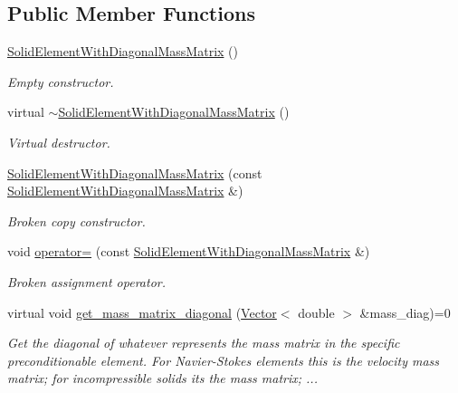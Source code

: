 \subsection*{Public Member Functions}
\begin{DoxyCompactItemize}
\item 
\hyperlink{classoomph_1_1SolidElementWithDiagonalMassMatrix_a2ae82e9b929bb41842955ab13f255104}{Solid\+Element\+With\+Diagonal\+Mass\+Matrix} ()
\begin{DoxyCompactList}\small\item\em Empty constructor. \end{DoxyCompactList}\item 
virtual \hyperlink{classoomph_1_1SolidElementWithDiagonalMassMatrix_aea964b70c55588fabf8cbc7fffe9be4a}{$\sim$\+Solid\+Element\+With\+Diagonal\+Mass\+Matrix} ()
\begin{DoxyCompactList}\small\item\em Virtual destructor. \end{DoxyCompactList}\item 
\hyperlink{classoomph_1_1SolidElementWithDiagonalMassMatrix_af26b74b9e29bc074bf2845556ff1bbae}{Solid\+Element\+With\+Diagonal\+Mass\+Matrix} (const \hyperlink{classoomph_1_1SolidElementWithDiagonalMassMatrix}{Solid\+Element\+With\+Diagonal\+Mass\+Matrix} \&)
\begin{DoxyCompactList}\small\item\em Broken copy constructor. \end{DoxyCompactList}\item 
void \hyperlink{classoomph_1_1SolidElementWithDiagonalMassMatrix_af7f7f5c4068cbfa7237be672d5b0fa58}{operator=} (const \hyperlink{classoomph_1_1SolidElementWithDiagonalMassMatrix}{Solid\+Element\+With\+Diagonal\+Mass\+Matrix} \&)
\begin{DoxyCompactList}\small\item\em Broken assignment operator. \end{DoxyCompactList}\item 
virtual void \hyperlink{classoomph_1_1SolidElementWithDiagonalMassMatrix_ad2335852a20987f6a6c8e0d6ce5bc3af}{get\+\_\+mass\+\_\+matrix\+\_\+diagonal} (\hyperlink{classoomph_1_1Vector}{Vector}$<$ double $>$ \&mass\+\_\+diag)=0
\begin{DoxyCompactList}\small\item\em Get the diagonal of whatever represents the mass matrix in the specific preconditionable element. For Navier-\/\+Stokes elements this is the velocity mass matrix; for incompressible solids it\textquotesingle{}s the mass matrix; ... \end{DoxyCompactList}\end{DoxyCompactItemize}


